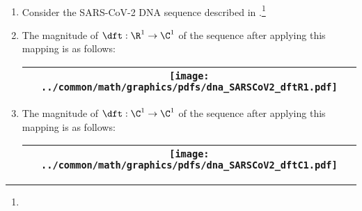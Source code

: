 \begin{example}
\label{ex:dftSARS-CoV-2}
\mbox{}\\
\begin{enumerate}
  \item \label{item:dftSARS-CoV-2_psp}
     Consider the SARS-CoV-2 DNA sequence described in .\footnote{}
  
  \item \label{item:dftSARS-CoV-2_R1pam}
    The magnitude of $\dft:\R^1\to\C^1$ of the sequence after applying this mapping is as follows:
    \\\begin{tabular}{|>{\scs}c|}
         \hline
         \texttt{[image: ../common/math/graphics/pdfs/dna\_SARSCoV2\_dftR1.pdf]}%
       \\\hline
    \end{tabular}
     
  \item \label{item:dftSARS-CoV-2_C1qpsk}
    The magnitude of $\dft:\C^1\to\C^1$ of the sequence after applying this mapping is as follows:
     \\\begin{tabular}{|>{\scs}c|}
          \hline
          \texttt{[image: ../common/math/graphics/pdfs/dna\_SARSCoV2\_dftC1.pdf]}%
        \\\hline
     \end{tabular}


\end{enumerate}
\end{example}
